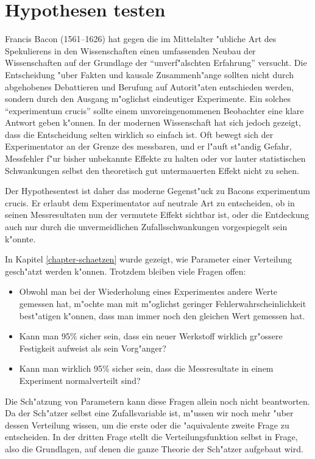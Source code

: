 %
%
%
\chapter{Hypothesen testen} \label{chapter-hypothesen-testen}
Francis Bacon (1561--1626) hat gegen die im Mittelalter "ubliche
Art des Spekulierens in den Wissenschaften einen umfassenden Neubau
der Wissenschaften auf der Grundlage der ``unverf"alschten Erfahrung''
versucht.
Die Entscheidung "uber Fakten und kausale Zusammenh"ange
sollten nicht durch abgehobenes Debattieren und Berufung auf 
Autorit"aten entschieden werden, sondern durch den Ausgang
m"oglichst eindeutiger Experimente.
Ein solches ``experimentum crucis''
sollte einem unvoreingenommenen Beobachter eine klare Antwort geben
k"onnen.
In der modernen Wissenschaft hat sich jedoch gezeigt, dass
die Entscheidung selten wirklich so einfach ist.
Oft bewegt sich
der Experimentator an der Grenze des messbaren, und er l"auft
st"andig Gefahr, Messfehler f"ur bisher unbekannte Effekte zu halten
oder vor lauter statistischen Schwankungen selbst den theoretisch
gut untermauerten Effekt nicht zu sehen.

Der Hypothesentest ist daher das moderne Gegenst"uck zu Bacons
experimentum crucis.
Er erlaubt dem Experimentator auf neutrale
Art zu entscheiden, ob in seinen Messresultaten nun der vermutete
Effekt sichtbar ist, oder die Entdeckung auch nur durch die unvermeidlichen
Zufallsschwankungen vorgespiegelt sein k"onnte.

In Kapitel \ref{chapter-schaetzen} wurde gezeigt, wie Parameter einer
Verteilung gesch"atzt werden k"onnen.
Trotzdem bleiben viele Fragen offen:
\begin{itemize}
\item Obwohl man bei der Wiederholung eines Experimentes andere Werte
gemessen hat, m"ochte man mit m"oglichst geringer Fehlerwahrscheinlichkeit
best"atigen k"onnen, dass man immer noch den gleichen Wert gemessen hat.
\item Kann man 95\% sicher sein, dass ein neuer Werkstoff wirklich gr"ossere
Festigkeit aufweist als sein Vorg"anger?
\item Kann man wirklich 95\% sicher sein, dass die Messresultate
in einem Experiment normalverteilt sind?
\end{itemize}
Die Sch"atzung von Parametern kann diese Fragen allein noch nicht beantworten.
Da der Sch"atzer selbst eine Zufallsvariable ist, m"ussen wir noch
mehr "uber dessen Verteilung wissen, um die erste oder die "aquivalente
zweite Frage zu entscheiden.
In der dritten Frage stellt die
Verteilungsfunktion selbst in Frage, also die Grundlagen, auf denen
die ganze Theorie der Sch"atzer aufgebaut wird.

